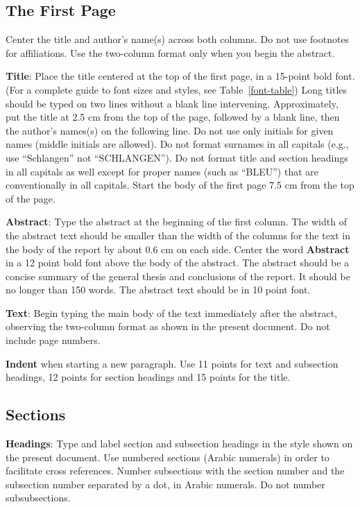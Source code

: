 \documentclass[11pt]{article}
\begin{document}
\subsection{The First Page}
\label{ssec:first}

Center the title and author's name(s) across both
columns. Do not use footnotes for affiliations. Use the
two-column format only when you begin the abstract.

{\bf Title}: Place the title centered at the top of the first page, in
a 15-point bold font. (For a complete guide to font sizes and styles,
see Table~\ref{font-table}) Long titles should be typed on two lines
without a blank line intervening. Approximately, put the title at 2.5
cm from the top of the page, followed by a blank line, then the
author's names(s) on the following line. Do not
use only initials for given names (middle initials are allowed). Do
not format surnames in all capitals (e.g., use ``Schlangen'' not
``SCHLANGEN'').  Do not format title and section headings in all
capitals as well except for proper names (such as ``BLEU'') that are
conventionally in all capitals. Start the body of the first page 7.5 cm from the top of the
page.

{\bf Abstract}: Type the abstract at the beginning of the first
column. The width of the abstract text should be smaller than the
width of the columns for the text in the body of the report by about
0.6 cm on each side. Center the word {\bf Abstract} in a 12 point bold
font above the body of the abstract. The abstract should be a concise
summary of the general thesis and conclusions of the report. It should
be no longer than 150 words. The abstract text should be in 10 point font.

{\bf Text}: Begin typing the main body of the text immediately after
the abstract, observing the two-column format as shown in 
the present document. Do not include page numbers.

{\bf Indent} when starting a new paragraph. Use 11 points for text and 
subsection headings, 12 points for section headings and 15 points for
the title. 

\subsection{Sections}

{\bf Headings}: Type and label section and subsection headings in the
style shown on the present document.  Use numbered sections (Arabic
numerals) in order to facilitate cross references. Number subsections
with the section number and the subsection number separated by a dot,
in Arabic numerals. Do not number subsubsections.
\end{document}
